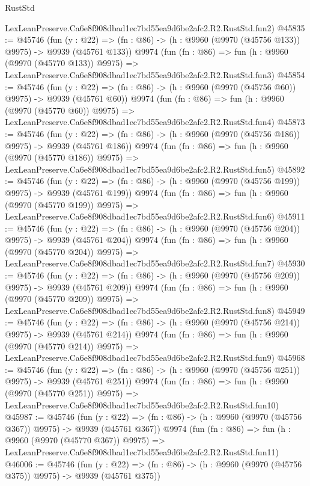 \begin{lexlean}{RustStd}
\begin{coremodule}
    LexLeanPreserve.Ca6e8f908dbad1ec7bd55ea9d6be2afc2.R2.RustStd.fun2)
@45835 := @45746
    (fun (y : @22) => (fn : @86) -> (h : @9960 (@9970 (@45756 @133)) @9975) -> @9939 (@45761 @133))
    @9974
    (fun (fn : @86) =>
    fun (h : @9960 (@9970 (@45770 @133)) @9975) =>
    LexLeanPreserve.Ca6e8f908dbad1ec7bd55ea9d6be2afc2.R2.RustStd.fun3)
@45854 := @45746
    (fun (y : @22) => (fn : @86) -> (h : @9960 (@9970 (@45756 @60)) @9975) -> @9939 (@45761 @60))
    @9974
    (fun (fn : @86) =>
    fun (h : @9960 (@9970 (@45770 @60)) @9975) =>
    LexLeanPreserve.Ca6e8f908dbad1ec7bd55ea9d6be2afc2.R2.RustStd.fun4)
@45873 := @45746
    (fun (y : @22) => (fn : @86) -> (h : @9960 (@9970 (@45756 @186)) @9975) -> @9939 (@45761 @186))
    @9974
    (fun (fn : @86) =>
    fun (h : @9960 (@9970 (@45770 @186)) @9975) =>
    LexLeanPreserve.Ca6e8f908dbad1ec7bd55ea9d6be2afc2.R2.RustStd.fun5)
@45892 := @45746
    (fun (y : @22) => (fn : @86) -> (h : @9960 (@9970 (@45756 @199)) @9975) -> @9939 (@45761 @199))
    @9974
    (fun (fn : @86) =>
    fun (h : @9960 (@9970 (@45770 @199)) @9975) =>
    LexLeanPreserve.Ca6e8f908dbad1ec7bd55ea9d6be2afc2.R2.RustStd.fun6)
@45911 := @45746
    (fun (y : @22) => (fn : @86) -> (h : @9960 (@9970 (@45756 @204)) @9975) -> @9939 (@45761 @204))
    @9974
    (fun (fn : @86) =>
    fun (h : @9960 (@9970 (@45770 @204)) @9975) =>
    LexLeanPreserve.Ca6e8f908dbad1ec7bd55ea9d6be2afc2.R2.RustStd.fun7)
@45930 := @45746
    (fun (y : @22) => (fn : @86) -> (h : @9960 (@9970 (@45756 @209)) @9975) -> @9939 (@45761 @209))
    @9974
    (fun (fn : @86) =>
    fun (h : @9960 (@9970 (@45770 @209)) @9975) =>
    LexLeanPreserve.Ca6e8f908dbad1ec7bd55ea9d6be2afc2.R2.RustStd.fun8)
@45949 := @45746
    (fun (y : @22) => (fn : @86) -> (h : @9960 (@9970 (@45756 @214)) @9975) -> @9939 (@45761 @214))
    @9974
    (fun (fn : @86) =>
    fun (h : @9960 (@9970 (@45770 @214)) @9975) =>
    LexLeanPreserve.Ca6e8f908dbad1ec7bd55ea9d6be2afc2.R2.RustStd.fun9)
@45968 := @45746
    (fun (y : @22) => (fn : @86) -> (h : @9960 (@9970 (@45756 @251)) @9975) -> @9939 (@45761 @251))
    @9974
    (fun (fn : @86) =>
    fun (h : @9960 (@9970 (@45770 @251)) @9975) =>
    LexLeanPreserve.Ca6e8f908dbad1ec7bd55ea9d6be2afc2.R2.RustStd.fun10)
@45987 := @45746
    (fun (y : @22) => (fn : @86) -> (h : @9960 (@9970 (@45756 @367)) @9975) -> @9939 (@45761 @367))
    @9974
    (fun (fn : @86) =>
    fun (h : @9960 (@9970 (@45770 @367)) @9975) =>
    LexLeanPreserve.Ca6e8f908dbad1ec7bd55ea9d6be2afc2.R2.RustStd.fun11)
@46006 := @45746
    (fun (y : @22) => (fn : @86) -> (h : @9960 (@9970 (@45756 @375)) @9975) -> @9939 (@45761 @375))

\end{coremodule}
\end{lexlean}
